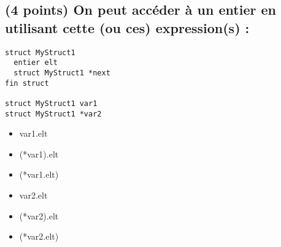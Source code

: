 \documentclass[11pt,a4paper]{article}
\begin{document}
\vfillLast

\newpage

\vfillFirst


\subsection{(4 points) On peut accéder à un entier en utilisant cette (ou ces) expression(s) : }

\begin{center}
\begin{lstlisting}[style=algorithmique]
struct MyStruct1
  entier elt
  struct MyStruct1 *next
fin struct 

struct MyStruct1 var1
struct MyStruct1 *var2 \end{lstlisting}
\end{center}



\begin{table}[ht!]
  \centering
  \begin{minipage}{0.45\textwidth}
    \centering
\begin{itemize}
  \item[\checkmark] var1.elt    \\
  \item[\CaseCoche] (*var1).elt \\
  \item[\CaseCoche] (*var1.elt) \\
\end{itemize}
  \end{minipage}
  \hfillx
  \begin{minipage}{0.45\textwidth}
    \centering
\begin{itemize}
  \item[\CaseCoche] var2.elt    \\
  \item[\checkmark] (*var2).elt \\
  \item[\CaseCoche] (*var2.elt) \\
\end{itemize}
  \end{minipage}
\end{table}


\bigskip
\end{document}
